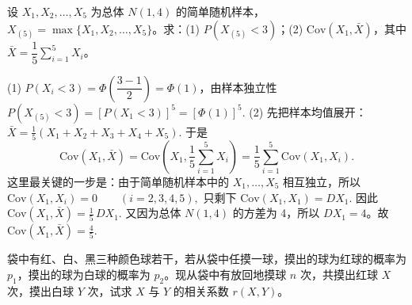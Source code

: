 \documentclass[lang=cn,11pt]{elegantbook}
\begin{document}
\begin{exercise}\label{exer:4-sample-cov}
设 \(X_1, X_2, \dots, X_5\) 为总体 \(N(1,4)\) 的简单随机样本，\(X_{(5)} = \max\{X_1, X_2, \dots, X_5\}\)。求：(1) \(P(X_{(5)} < 3)\)；(2) \(\mathrm{Cov}(X_1, \bar{X})\)，其中 \(\bar{X} = \dfrac{1}{5}\sum\limits_{i=1}^{5}X_i\)。
\end{exercise}
\begin{solution}
(1) \(P(X_i < 3) = \Phi\!\left(\dfrac{3-1}{2}\right) = \Phi(1)\)，由样本独立性
\(
P(X_{(5)} < 3) = [P(X_1 < 3)]^5 = [\Phi(1)]^5.
\)
(2) 先把样本均值展开：
\(
\bar X=\frac15(X_1+X_2+X_3+X_4+X_5).
\)
于是
\[
\mathrm{Cov}(X_1,\bar X)
=\mathrm{Cov}\!\left(X_1,\frac15\sum_{i=1}^{5}X_i\right)
=\frac15\sum_{i=1}^{5}\mathrm{Cov}(X_1,X_i).
\]
这里最关键的一步是：由于简单随机样本中的 \(X_1,\dots,X_5\) 相互独立，所以
\(
\mathrm{Cov}(X_1,X_i)=0\qquad (i=2,3,4,5),
\)
只剩下
\(
\mathrm{Cov}(X_1,X_1)=DX_1.
\)
因此
\(
\mathrm{Cov}(X_1,\bar X)=\frac15\,DX_1.
\)
又因为总体 \(N(1,4)\) 的方差为 4，所以 \(DX_1=4\)。故
\(
\mathrm{Cov}(X_1,\bar X)=\frac45.
\)
\end{solution}


\begin{exercise}[多项分布的相关系数] 
袋中有红、白、黑三种颜色球若干，若从袋中任摸一球，摸出的球为红球的概率为 $p_1$，摸出的球为白球的概率为 $p_2$。现从袋中有放回地摸球 $n$ 次，共摸出红球 $X$ 次，摸出白球 $Y$ 次，试求 $X$ 与 $Y$ 的相关系数 $r(X,Y)$。
\end{exercise}
\end{document}
